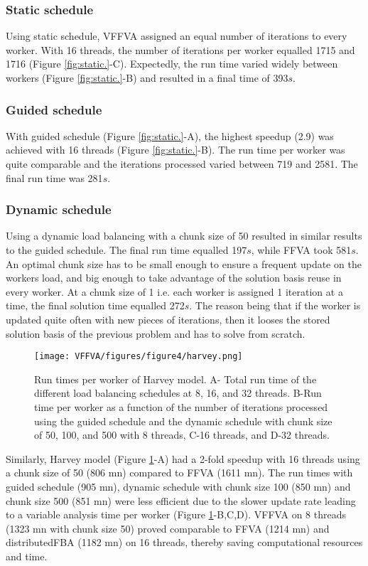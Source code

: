\subsubsection*{Static schedule}
Using static schedule, VFFVA assigned an equal number of iterations to every worker. With 16 threads, the number of iterations per worker equalled 1715 and 1716 (Figure \ref{fig:static.}-C). Expectedly, the run time varied widely between workers (Figure \ref{fig:static.}-B) and resulted in a final time of 393$s$.
\subsubsection*{Guided schedule}
With guided schedule (Figure \ref{fig:static.}-A), the highest speedup (2.9) was achieved with 16 threads (Figure \ref{fig:static.}-B). The run time per worker was quite comparable and the iterations processed varied between 719 and 2581. The final run time was 281$s$.
\subsubsection*{Dynamic schedule}
Using a dynamic load balancing with a chunk size of 50 resulted in similar results to the guided schedule. The final run time equalled 197$s$, while FFVA took 581$s$. An optimal chunk size has to be small enough to ensure a frequent update on the workers load, and big enough to take advantage of the solution basis reuse in every worker. At a chunk size of 1 i.e. each worker is assigned 1 iteration at a time, the final solution time equalled 272$s$. The reason being that if the worker is updated quite often with new pieces of iterations, then it looses the stored solution basis of the previous problem and has to solve from scratch.\\ 
\begin{figure}[!htp]
\centering
\texttt{[image: VFFVA/figures/figure4/harvey.png]}
\caption[Run times per worker of Harvey model.]{Run times per worker of Harvey model. A- Total run time of the different load balancing schedules at 8, 16, and 32 threads. B-Run time per worker as a function of the number of iterations processed using the guided schedule and the dynamic schedule with chunk size of 50, 100, and 500 with 8 threads, C-16 threads, and D-32 threads.}
\label{fig:harvey.}
\end{figure}
Similarly, Harvey model \cite{thiele2018metabolism} (Figure \ref{fig:harvey.}-A) had a 2-fold speedup with 16 threads using a chunk size of 50 (806 mn) compared to FFVA (1611 mn). The run times with guided schedule (905 mn), dynamic schedule with chunk size 100 (850 mn) and chunk size 500 (851 mn) were less efficient due to the slower update rate leading to a variable analysis time per worker (Figure \ref{fig:harvey.}-B,C,D). VFFVA on 8 threads (1323 mn with chunk size 50) proved comparable to FFVA (1214 mn) and distributedFBA (1182 mn) on 16 threads, thereby saving computational resources and time. 
